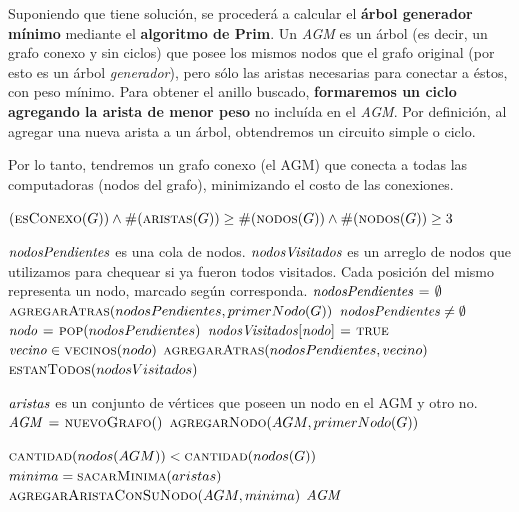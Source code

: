 Suponiendo que tiene solución, se procederá a calcular el \textbf{árbol
generador mínimo} mediante el \textbf{algoritmo de Prim}. Un \textit{AGM} es
un árbol (es decir, un grafo conexo y sin ciclos) que posee los mismos nodos 
que el grafo original (por esto es un árbol \textit{generador}), pero sólo las aristas 
necesarias para conectar a éstos, con peso mínimo. Para obtener el anillo buscado, 
\textbf{formaremos un ciclo agregando la arista de menor peso} no incluída en el 
\textit{AGM}. Por definición, al agregar una nueva arista a un árbol, obtendremos 
un circuito simple o ciclo.	

Por lo tanto, tendremos un grafo conexo (el AGM) que conecta a todas las computadoras 
(nodos del grafo), minimizando el costo de las conexiones.


\begin{codebox}
\li \Return $(\textnormal{\scshape esConexo}(G)) \land
    \textnormal{\scshape\#}(\textnormal{\scshape aristas}(G)) \geq
    \textnormal{\scshape\#}(\textnormal{\scshape nodos}(G)) \land
    \textnormal{\scshape\#}(\textnormal{\scshape nodos}(G)) \geq 3$
\end{codebox}


\vspace*{0.3cm}


\begin{codebox}
\li \Comment $\id{nodosPendientes}$ es una cola de nodos.
\li \Comment $\id{nodosVisitados}$ es un arreglo de nodos que
\li \Comment utilizamos para chequear si ya fueron todos visitados.
\li \Comment Cada posición del mismo representa un nodo, marcado según corresponda.
\li $\id{nodosPendientes} \gets \emptyset$
\li $\textnormal{\scshape agregarAtras}(nodosPendientes, primerNodo(G))$
\li \While $\id{nodosPendientes} \neq \emptyset$
        \Do
\li         $\id{nodo} \gets \proc{pop}(nodosPendientes)$
\li         $\id{nodosVisitados[nodo]} \gets \const{true}$
            \For $\id{vecino} \in \proc{vecinos}(nodo)$
\li             \Do
                    $\textnormal{\scshape agregarAtras}(nodosPendientes, vecino)$
                \End
        \End
\li \Return $\textnormal{\scshape estanTodos}(nodosVisitados)$
\end{codebox}


\vspace*{0.3cm}


\begin{codebox}
\li \Comment $\id{aristas}$ es un conjunto de vértices que 
\li \Comment poseen un nodo en el AGM y otro no.
\li $\id{AGM} \gets \proc{nuevoGrafo}()$
\li $\textnormal{\scshape agregarNodo}(AGM, primerNodo(G))$

\li \While $\textnormal{\scshape cantidad}(nodos(AGM)) < \textnormal{\scshape cantidad}(nodos(G))$
      \Do
\li     $minima = \textnormal{\scshape sacarMinima}(aristas)$
\li     $\textnormal{\scshape agregarAristaConSuNodo}(AGM, minima)$
      \End
\li \Return $\id{AGM}$
\end{codebox}


